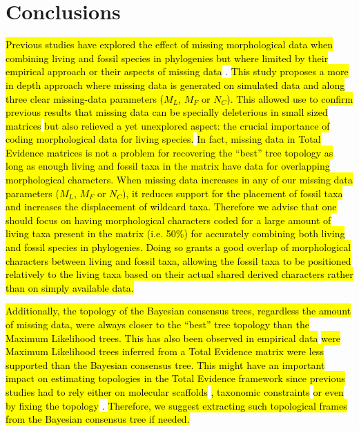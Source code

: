 \documentclass[12pt,letterpaper]{article}
\begin{document}
\section{Conclusions}
\hl{Previous studies have explored the effect of missing morphological data when combining living and fossil species in phylogenies but where limited by their empirical approach or their aspects of missing data }\citep{Wiens01102005,pattinsonphylogeny2014}.
\hl{This study proposes a more in depth approach where missing data is generated on simulated data and along three clear missing-data parameters ($M_{L}$, $M_{F}$ or $N_{C}$).
This allowed use to confirm previous results that missing data can be specially deleterious in small sized matrices }\citep{wiensmissing2003}\hl{ but also relieved a yet unexplored aspect: the crucial importance of coding morphological data for living species.}
\hl{In fact, missing data in Total Evidence matrices is not a problem for recovering the ``best'' tree topology as long as enough living and fossil taxa in the matrix have data for overlapping morphological characters.
When missing data increases in any of our missing data parameters ($M_{L}$, $M_{F}$ or $N_{C}$), it reduces support for the placement of fossil taxa and increases the displacement of wildcard taxa.
Therefore we advise that one should focus on having morphological characters coded for a large amount of living taxa present in the matrix (i.e. 50\%) for accurately combining both living and fossil species in phylogenies.
Doing so grants a good overlap of morphological characters between living and fossil taxa, allowing the fossil taxa to be positioned relatively to the living taxa based on their actual shared derived characters rather than on simply available data.}

\hl{Additionally, the topology of the Bayesian consensus trees, regardless the amount of missing data, were always closer to the ``best'' tree topology than the Maximum Likelihood trees.
This has also been observed in empirical data} \cite[\hl{e.g.}][]{Arcila2015131}\hl{ were Maximum Likelihood trees inferred from a Total Evidence matrix were less supported than the Bayesian consensus tree.
This might have an important impact on estimating topologies in the Total Evidence framework since previous studies had to rely either on molecular scaffolds }\citep[\hl{e.g.}][]{slaterphylogenetic2013}\hl{, taxonomic constraints }\citep[\hl{e.g.}][]{slaterphylogenetic2013,beckancient2014}\hl{ or even by fixing the topology }\cite[\hl{e.g.}][]{ronquista2012}.
\hl{Therefore, we suggest extracting such topological frames from the Bayesian consensus tree if needed.}
\end{document}
